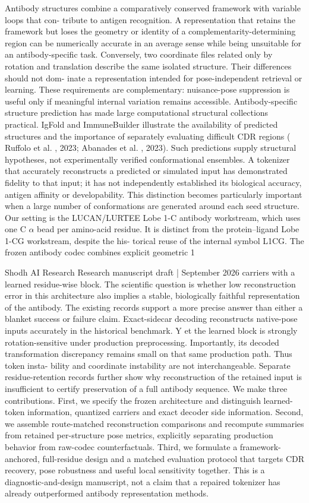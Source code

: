 \documentclass[11pt]{article}
\begin{document}
Antibody structures combine a comparatively conserved framework with variable loops that con-
tribute to antigen recognition. A representation that retains the framework but loses the geometry or
identity of a complementarity-determining region can be numerically accurate in an average sense
while being unsuitable for an antibody-specific task. Conversely, two coordinate files related only
by rotation and translation describe the same isolated structure. Their differences should not dom-
inate a representation intended for pose-independent retrieval or learning. These requirements are
complementary: nuisance-pose suppression is useful only if meaningful internal variation remains
accessible.
Antibody-specific structure prediction has made large computational structural collections practical.
IgFold and ImmuneBuilder illustrate the availability of predicted structures and the importance of
separately evaluating difficult CDR regions ( Ruffolo et al. , 2023; Abanades et al. , 2023). Such
predictions supply structural hypotheses, not experimentally verified conformational ensembles. A
tokenizer that accurately reconstructs a predicted or simulated input has demonstrated fidelity to that
input; it has not independently established its biological accuracy, antigen affinity or developability.
This distinction becomes particularly important when a large number of conformations are generated
around each seed structure.
Our setting is the LUCAN/LURTEE Lobe 1-C antibody workstream, which uses one C \ensuremath{\alpha} bead per
amino-acid residue. It is distinct from the protein–ligand Lobe 1-CG workstream, despite the his-
torical reuse of the internal symbol L1CG. The frozen antibody codec combines explicit geometric
1

Shodh AI Research Research manuscript draft | September 2026
carriers with a learned residue-wise block. The scientific question is whether low reconstruction
error in this architecture also implies a stable, biologically faithful representation of the antibody.
The existing records support a more precise answer than either a blanket success or failure claim.
Exact-sidecar decoding reconstructs native-pose inputs accurately in the historical benchmark. Y et
the learned block is strongly rotation-sensitive under production preprocessing. Importantly, its
decoded transformation discrepancy remains small on that same production path. Thus token insta-
bility and coordinate instability are not interchangeable. Separate residue-retention records further
show why reconstruction of the retained input is insufficient to certify preservation of a full antibody
sequence.
We make three contributions. First, we specify the frozen architecture and distinguish learned-
token information, quantized carriers and exact decoder side information. Second, we assemble
route-matched reconstruction comparisons and recompute summaries from retained per-structure
pose metrics, explicitly separating production behavior from raw-codec counterfactuals. Third, we
formulate a framework-anchored, full-residue design and a matched evaluation protocol that targets
CDR recovery, pose robustness and useful local sensitivity together. This is a diagnostic-and-design
manuscript, not a claim that a repaired tokenizer has already outperformed antibody representation
methods.
\end{document}
